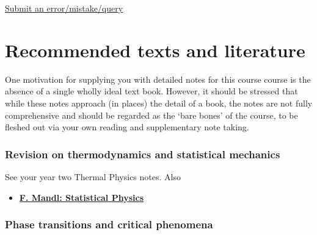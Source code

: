 \documentclass[
  letterpaper,
  DIV=11,
  numbers=noendperiod]{scrreprt}
\providecommand{\tightlist}{%
  \setlength{\itemsep}{0pt}\setlength{\parskip}{0pt}}
\begin{document}
\begin{tcolorbox}[enhanced jigsaw, opacityback=0, colframe=quarto-callout-note-color-frame, breakable, arc=.35mm, rightrule=.15mm, colback=white, bottomrule=.15mm, toprule=.15mm, leftrule=.75mm, left=2mm]

\href{https://forms.office.com/e/6uL2Bd5QGq}{Submit an
error/mistake/query}

\end{tcolorbox}


\chapter*{Recommended texts and literature}\label{literature}


One motivation for supplying you with detailed notes for this course
course is the absence of a single wholly ideal text book. However, it
should be stressed that while these notes approach (in places) the
detail of a book, the notes are not fully comprehensive and should be
regarded as the `bare bones' of the course, to be fleshed out via your
own reading and supplementary note taking.

\subsection*{Revision on thermodynamics and statistical
mechanics}\label{revision-on-thermodynamics-and-statistical-mechanics}

See your year two Thermal Physics notes. Also

\begin{itemize}
\tightlist
\item
  \textbf{\href{https://bris.on.worldcat.org/search/detail/15487191?queryString=F.\%20Mandl&clusterResults=true&stickyFacetsChecked=true&groupVariantRecords=false}{F.
  Mandl: Statistical Physics}}
\end{itemize}

\subsection*{Phase transitions and critical
phenomena}\label{phase-transitions-and-critical-phenomena}
\end{document}
